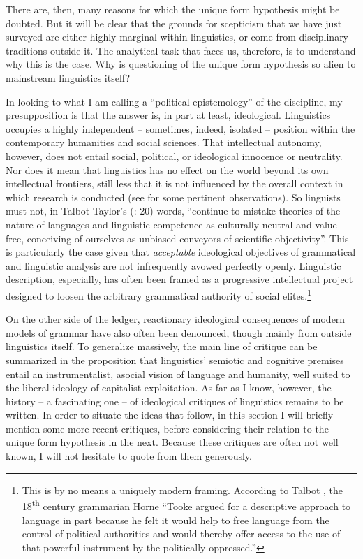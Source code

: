 \documentclass[output=paper]{langscibook}
\begin{document}
There are, then, many reasons for which the unique form hypothesis might be doubted. But it will be clear that the grounds for scepticism that we have just surveyed are either highly marginal within linguistics, or come from disciplinary traditions outside it. The analytical task that faces us, therefore, is to understand why this is the case. Why is questioning of the unique form hypothesis so alien to mainstream linguistics itself?

In looking to what I am calling a ``political epistemology'' of the discipline, my presupposition is that the answer is, in part at least, ideological. Linguistics occupies a highly independent -- sometimes, indeed, isolated -- position within the contemporary humanities and social sciences. That intellectual autonomy, however, does not entail social, political, or ideological innocence or neutrality. Nor does it mean that linguistics has no effect on the world beyond its own intellectual frontiers, still less that it is not influenced by the overall context in which research is conducted (see \citealt[182]{Joseph2002} for some pertinent observations). So linguists must not, in Talbot Taylor's (\citeyear{Taylor1990}: 20) words, ``continue to mistake theories of the nature of languages and linguistic competence as culturally neutral and value-free, conceiving of ourselves as unbiased conveyors of scientific objectivity''. This is particularly the case given that \emph{acceptable} ideological objectives of grammatical and linguistic analysis are not infrequently avowed perfectly openly. Linguistic description, especially, has often been framed as a progressive intellectual project designed to loosen the arbitrary grammatical authority of social elites.\footnote{This is by no means a uniquely modern framing. According to Talbot \citet[11]{Taylor1990}, the 18\textsuperscript{th} century grammarian Horne ``Tooke argued for a descriptive approach to language in part because he felt it would help to free language from the control of political authorities and would thereby offer access to the use of that powerful instrument by the politically oppressed.''}

On the other side of the ledger, reactionary ideological consequences of modern models of grammar have also often been denounced, though mainly from outside linguistics itself. To generalize massively, the main line of critique can be summarized in the proposition that linguistics' semiotic and cognitive premises entail an instrumentalist, asocial vision of language and humanity, well suited to the liberal ideology of capitalist exploitation. As far as I know, however, the history -- a fascinating one -- of ideological critiques of linguistics remains to be written. In order to situate the ideas that follow, in this section I will briefly mention some more recent critiques, before considering their relation to the unique form hypothesis in the next. Because these critiques are often not well known, I will not hesitate to quote from them generously.
\end{document}
